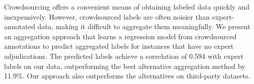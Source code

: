 Crowdsourcing offers a convenient means of obtaining labeled data quickly and inexpensively.              However, crowdsourced labels are often noisier than expert-annotated data, making it difficult to aggregate them meaningfully.  We present an aggregation approach that learns a regression model from crowdsourced annotations to predict aggregated labels for instances that have no expert adjudications.  The predicted labels achieve a correlation of 0.594 with expert labels on our data, outperforming the best alternative aggregation method by 11.9\%.  Our approach also outperforms the alternatives on third-party datasets.
